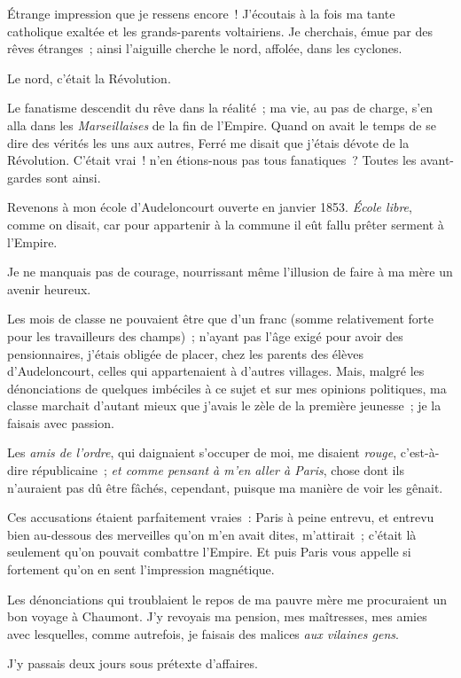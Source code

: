 \documentclass[french,twoside]{book} %
\begin{document}
Étrange impression que je ressens encore ! J’écoutais à la fois ma tante catholique exaltée et les grands-parents voltairiens. Je cherchais, émue par des rêves étranges ; ainsi l’aiguille cherche le nord, affolée, dans les cyclones.\par
Le nord, c’était la Révolution.\par
Le fanatisme descendit du rêve dans la réalité ; ma vie, au pas de charge, s’en alla dans les \emph{Marseillaises} de la fin de l’Empire. Quand on avait le temps de se dire des vérités les uns aux autres, Ferré me disait que j’étais dévote de la Révolution. C’était vrai ! n’en étions-nous pas tous fanatiques ? Toutes les avant-gardes sont ainsi.\par
Revenons à mon école d’Audeloncourt ouverte en janvier 1853. \emph{École libre}, comme on disait, car pour appartenir à la commune il eût fallu prêter serment à l’Empire.\par
Je ne manquais pas de courage, nourrissant même l’illusion de faire à ma mère un avenir heureux.\par
Les mois de classe ne pouvaient être que d’un franc (somme relativement forte pour les travailleurs des champs) ; n’ayant pas l’âge exigé pour avoir des pensionnaires, j’étais obligée de placer, chez les parents des élèves d’Audeloncourt, celles  qui appartenaient à d’autres villages. Mais, malgré les dénonciations de quelques imbéciles à ce sujet et sur mes opinions politiques, ma classe marchait d’autant mieux que j’avais le zèle de la première jeunesse ; je la faisais avec passion.\par
Les \emph{amis de l’ordre}, qui daignaient s’occuper de moi, me disaient \emph{rouge}, c’est-à-dire républicaine ; \emph{et comme pensant à m’en aller à Paris}, chose dont ils n’auraient pas dû être fâchés, cependant, puisque ma manière de voir les gênait.\par
Ces accusations étaient parfaitement vraies : Paris à peine entrevu, et entrevu bien au-dessous des merveilles qu’on m’en avait dites, m’attirait ; c’était là seulement qu’on pouvait combattre l’Empire. Et puis Paris vous appelle si fortement qu’on en sent l’impression magnétique.\par
Les dénonciations qui troublaient le repos de ma pauvre mère me procuraient un bon voyage à Chaumont. J’y revoyais ma pension, mes maîtresses, mes amies avec lesquelles, comme autrefois, je faisais des malices \emph{aux vilaines gens}.\par
J’y passais deux jours sous prétexte d’affaires.\par
\end{document}
